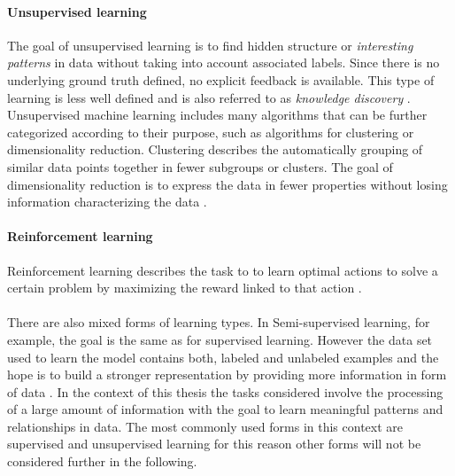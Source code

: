 \paragraph{Unsupervised learning}
The goal of unsupervised learning is to find hidden structure or \textit{interesting patterns} in data without taking into account associated labels. Since there is no underlying ground truth defined, no explicit feedback is available. This type of learning is less well defined and is also referred to as \textit{knowledge discovery} \cite{Murphy2012}. Unsupervised machine learning includes many algorithms that can be further categorized according to their purpose, such as algorithms for clustering or dimensionality reduction. Clustering describes the automatically grouping of similar data points together in fewer subgroups or clusters. The goal of dimensionality reduction is to express the data in fewer properties without losing information characterizing the data \cite{Cunningham2014}. 
\paragraph{Reinforcement learning}
Reinforcement learning describes the task to to learn optimal actions to solve a certain problem by maximizing the reward linked to that action \cite{Murphy2012}. \\
\\
There are also mixed forms of learning types. In Semi-supervised learning, for example, the goal is the same as for supervised learning. However the data set used to learn the model contains both, labeled and unlabeled examples and the hope is to build a stronger representation by providing more information in form of data \cite{Burkov2019}. In the context of this thesis the tasks considered involve the processing of a large amount of information with the goal to learn meaningful patterns and relationships in data. The most commonly used forms in this context are supervised and unsupervised learning for this reason other forms will not be considered further in the following.

